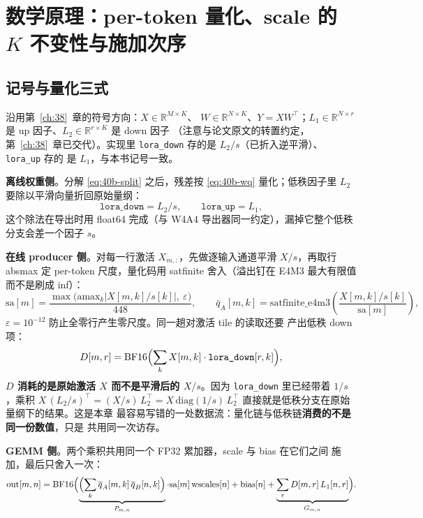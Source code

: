 \section{数学原理：per-token 量化、scale 的 $K$ 不变性与施加次序}\label{sec:40b-math}

\subsection{记号与量化三式}

沿用第~\ref{ch:38}~章的符号方向：$X\in\mathbb{R}^{M\times K}$、
$W\in\mathbb{R}^{N\times K}$、$Y=XW^{\top}$；$L_1\in\mathbb{R}^{N\times r}$
是 up 因子、$L_2\in\mathbb{R}^{r\times K}$ 是 down 因子
（注意与论文原文的转置约定，第~\ref{ch:38}~章已交代）。实现里
\texttt{lora\_down} 存的是 $L_2/s$（已折入逆平滑）、\texttt{lora\_up} 存的
是 $L_1$，与本书记号一致。

\textbf{离线权重侧}。分解 \eqref{eq:40b-split} 之后，残差按
\eqref{eq:40b-wq} 量化；低秩因子里 $L_2$ 要除以平滑向量折回原始量纲：
\begin{equation}
  \texttt{lora\_down} = L_2 / s,
  \qquad
  \texttt{lora\_up} = L_1,
  \label{eq:40b-offline}
\end{equation}
这个除法在导出时用 float64 完成（与 W4A4 导出器同一约定），漏掉它整个低秩
分支会差一个因子 $s$。

\textbf{在线 producer 侧}。对每一行激活 $X_{m,:}$，先做逐输入通道平滑
$X/s$，再取行 absmax 定 per-token 尺度，量化码用 satfinite 舍入（溢出钉在
E4M3 最大有限值而不是刷成 inf）：
\begin{equation}
  \mathrm{sa}[m]
    = \frac{\max\bigl(\mathrm{amax}_k |X[m,k]/s[k]|,\ \varepsilon\bigr)}{448},
  \qquad
  \bar q_A[m,k]
    = \mathrm{satfinite\_e4m3}\!\left(\frac{X[m,k]/s[k]}{\mathrm{sa}[m]}\right),
  \label{eq:40b-aq}
\end{equation}
$\varepsilon=10^{-12}$ 防止全零行产生零尺度。同一趟对激活 tile 的读取还要
产出低秩 down 项：
\begin{equation}
  D[m,r] = \mathrm{BF16}\Bigl(\sum_{k} X[m,k]\cdot\texttt{lora\_down}[r,k]\Bigr),
  \label{eq:40b-d}
\end{equation}
\textbf{$D$ 消耗的是原始激活 $X$ 而不是平滑后的 $X/s$}。因为
\texttt{lora\_down} 里已经带着 $1/s$，乘积
$X\,(L_2/s)^{\top}=(X/s)\,L_2^{\top}=X\,\mathrm{diag}(1/s)\,L_2^{\top}$
直接就是低秩分支在原始量纲下的结果。这是本章
最容易写错的一处数据流：量化链与低秩链\textbf{消费的不是同一份数值}，只是
共用同一次访存。

\textbf{GEMM 侧}。两个乘积共用同一个 FP32 累加器，scale 与 bias 在它们之间
施加，最后只舍入一次：
\begin{equation}
  \mathrm{out}[m,n]
    = \mathrm{BF16}\Bigl(
        \underbrace{\Bigl(\sum_k \bar q_A[m,k]\,\bar q_B[n,k]\Bigr)}_{P_{m,n}}
        \cdot \mathrm{sa}[m]\,\mathrm{wscales}[n]
        + \mathrm{bias}[n]
        + \underbrace{\sum_r D[m,r]\,L_1[n,r]}_{G_{m,n}}
      \Bigr).
  \label{eq:40b-gemm}
\end{equation}

